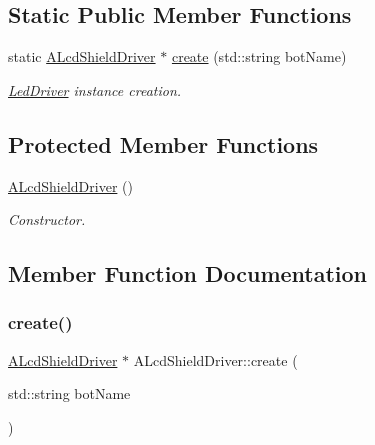 \subsection*{Static Public Member Functions}
\begin{DoxyCompactItemize}
\item 
static \hyperlink{classALcdShieldDriver}{A\+Lcd\+Shield\+Driver} $\ast$ \hyperlink{classALcdShieldDriver_af7c1a516543d6548ea46b12052ed146c}{create} (std\+::string bot\+Name)
\begin{DoxyCompactList}\small\item\em \hyperlink{classLedDriver}{Led\+Driver} instance creation. \end{DoxyCompactList}\end{DoxyCompactItemize}
\subsection*{Protected Member Functions}
\begin{DoxyCompactItemize}
\item 
\mbox{\label{classALcdShieldDriver_adf8579c5842f2e5848f91759487b9bad}} 
\hyperlink{classALcdShieldDriver_adf8579c5842f2e5848f91759487b9bad}{A\+Lcd\+Shield\+Driver} ()
\begin{DoxyCompactList}\small\item\em Constructor. \end{DoxyCompactList}\end{DoxyCompactItemize}


\subsection{Member Function Documentation}
\mbox{\label{classALcdShieldDriver_af7c1a516543d6548ea46b12052ed146c}} 
\subsubsection{\texorpdfstring{create()}{create()}}
{\footnotesize\ttfamily \hyperlink{classALcdShieldDriver}{A\+Lcd\+Shield\+Driver} $\ast$ A\+Lcd\+Shield\+Driver\+::create (\begin{DoxyParamCaption}\item[{std\+::string}]{bot\+Name }\end{DoxyParamCaption})\hspace{0.3cm}{\ttfamily [static]}}



